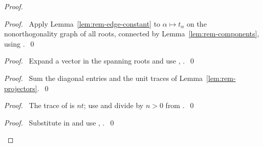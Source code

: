 \begin{proof}
\begin{proof}\pf\ Apply Lemma~\ref{lem:rem-edge-constant} to
$\alpha\mapsto t_\alpha$ on the nonorthogonality graph of all roots,
connected by Lemma~\ref{lem:rem-components}, using .~\qed\end{proof}
\begin{proof}\pf\ Expand a vector in the spanning roots and use
, .~\qed\end{proof}
\begin{proof}\pf\ Sum the diagonal entries and the unit traces of
Lemma~\ref{lem:rem-projectors}.~\qed\end{proof}
\begin{proof}\pf\ The trace of  is $nt$;
use  and divide by $n>0$ from .~\qed\end{proof}
\qedstep
\begin{proof}\pf\ Substitute  in 
and use , .~\qed\end{proof}
\end{proof}

